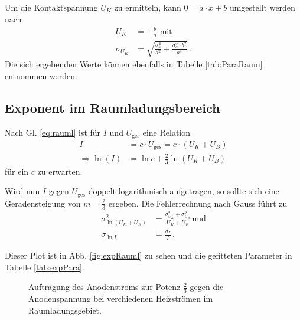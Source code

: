 \documentclass[12pt,a4paper,titlepage,headinclude,bibtotoc]{scrartcl}
\begin{document}
Um die Kontaktspannung $U_K$ zu ermitteln, kann $0=a\cdot x + b$ umgestellt werden nach 
\begin{align*}
U_K &= -\frac{b}{a} \text{ mit}\\
\sigma_{U_K} &= \sqrt{\frac{\sigma_b^2}{a^2}+\frac{\sigma_a^2 \cdot b^2}{a^4}}\, .
\end{align*}
Die sich ergebenden Werte können ebenfalls in Tabelle \ref{tab:ParaRaum} entnommen werden.\\


\subsection{Exponent im Raumladungsbereich}
Nach Gl. \eqref{eq:rauml} ist für $I$ und $U_\text{ges}$ eine Relation
\begin{align}
I &= c\cdot U_\text{ges} = c\cdot \left( U_K+U_B \right)\\
\Rightarrow \ln (I) &= \ln c + \frac{2}{3} \ln \left( U_K + U_B \right)
\end{align}
für ein $c$ zu erwarten.

Wird nun $I$ gegen $U_\text{ges}$ doppelt logarithmisch aufgetragen, so sollte sich eine Geradensteigung von $m=\frac{2}{3}$ ergeben.
Die Fehlerrechnung nach Gauss führt zu
\begin{align}
\sigma_{\ln\left( U_K + U_B \right)}^2 &= \frac{\sigma_{U_K}^2 + \sigma_{U_B}^2}{U_K + U_B}\, \text{und}\\
\sigma_{\ln I} &= \frac{\sigma_I}{I}\,.
\end{align}

Dieser Plot ist in Abb. \ref{fig:expRauml} zu sehen und die gefitteten Parameter in Tabelle \ref{tab:expPara}.

\begin{figure}[h]
   \centering
   \hfill
   \hfill
   \caption{Auftragung des Anodenstroms zur Potenz $\frac{2}{3}$ gegen die Anodenspannung bei verchiedenen Heizströmen im Raumladungsgebiet.}
   \label{fig:raumladung}
 \end{figure}
\end{document}

